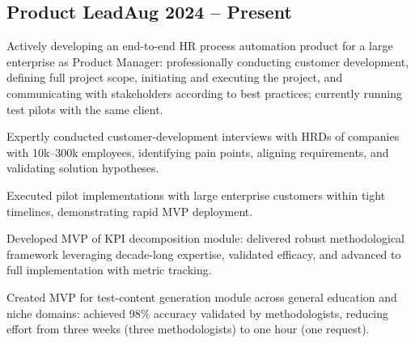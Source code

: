 \documentclass[a4paper,12pt]{article}
\begin{document}
\vspace*{6pt}
\subsection{{Product Lead}\hfill Aug 2024 -- Present}
\begin{zitemize}
\item Actively developing an end-to-end HR process automation product for a large enterprise as Product Manager: professionally conducting customer development, defining full project scope, initiating and executing the project, and communicating with stakeholders according to best practices; currently running test pilots with the same client.
\item Expertly conducted customer-development interviews with HRDs of companies with 10k--300k employees, identifying pain points, aligning requirements, and validating solution hypotheses.
\item Executed pilot implementations with large enterprise customers within tight timelines, demonstrating rapid MVP deployment.
\item Developed MVP of KPI decomposition module: delivered robust methodological framework leveraging decade-long expertise, validated efficacy, and advanced to full implementation with metric tracking.
\item Created MVP for test-content generation module across general education and niche domains: achieved 98\% accuracy validated by methodologists, reducing effort from three weeks (three methodologists) to one hour (one request).
\end{zitemize}

\vspace*{6pt}
\end{document}

